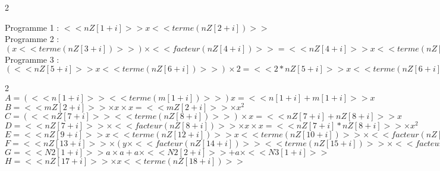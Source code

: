 \renewcommand{\headrulewidth}{1pt}

\renewcommand{\footrulewidth}{1pt}
\fancyfoot[C]{} 
\fancyfoot[L]{}



\setcounter{exo}{0}
\vfill
\begin{correction}
\begin{multicols}{2}
%
%


Programme 1 : $<<nZ[1+i]>> x <<terme(nZ[2+i])>>$\\
Programme 2 : $(x <<terme(nZ[3+i])>>)\times <<facteur(nZ[4+i])>>= <<nZ[4+i]>>  x  << terme( nZ[4+i] * nZ[3+i] ) >> $\\
Programme 3 : $( <<nZ[5+i]>> x <<terme(nZ[6+i])>> )\times 2= <<2* nZ[5+i]>> x <<terme(nZ[6+i])>>$




\begin{multicols}{2}
$A=(<<n[1+i]>>  <<terme(m[1+i])>>) x=<<n[1+i] +m[1+i]>> x$\\
$B=<<mZ[2+i]>> \times x\times x=<<mZ[2+i]>> \times x^2$\\
$C=(<<nZ[7+i]>> <<terme(nZ[8+i])>>) \times x=<<nZ[7+i] + nZ[8+i]>>  x$\\
$D=<<nZ[7+i]>>\times <<facteur(nZ[8+i])>>\times x\times x=<<nZ[7+i]* nZ[8+i]>>\times x^2$\\
$E= <<nZ[9+i]>>  x <<terme(nZ[12+i])>> x <<terme(nZ[10+i])>>\times <<facteur(nZ[11+i])>> = (<<nZ[9+i]>>  <<terme(nZ[12+i])>>) x <<terme(nZ[10+i] * nZ[11+i])>> = <<nZ[9+i] + nZ[12+i]>> x <<terme(nZ[10+i] * nZ[11+i])>> $\\
$F=<<nZ[13+i]>> \times (y\times <<facteur(nZ[14+i])>> <<terme(nZ[15+i])>> \times <<facteur(nZ[16+i])>>)$\\
$G=<<N2[1+i]>> a\times  a+a\times <<N2[2+i]>>+a\times <<N3[1+i]>>$\\
$H= <<nZ[17+i]>>\times x <<terme(nZ[18+i])>>$
\end{multicols}


\end{multicols}
\end{correction}
